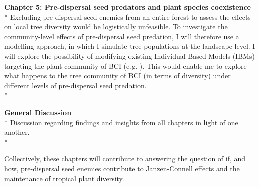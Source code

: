 \documentclass[12pt,a4]{RDGThesis}
\begin{document}
\textbf{Chapter 5: Pre-dispersal seed predators and plant species coexistence}\\*
    Excluding pre-dispersal seed enemies from an entire forest to assess the effects on local tree diversity would be logistically unfeasible. To investigate the community-level effects of pre-dispersal seed predation, I will therefore use a modelling approach, in which I simulate tree populations at the landscape level. I will explore the possibility of modifying existing Individual Based Models (IBMs) targeting the plant community of BCI (e.g. \cite{leviTropicalForestsCan2019, usinowiczTemporalCoexistenceMechanisms2017, usinowiczCoexistenceTropicalForests2012, caplatEffectsDisturbanceFrequency2009}). This would enable me to explore what happens to the tree community of BCI (in terms of diversity) under different levels of pre-dispersal seed predation.\\*

\textbf{General Discussion}\\*
    Discussion regarding findings and insights from all chapters in light of one another.\\*

Collectively, these chapters will contribute to answering the question of if, and how, pre-dispersal seed enemies contribute to Janzen-Connell effects and the maintenance of tropical plant diversity. 


%
%
% 

\end{document}

